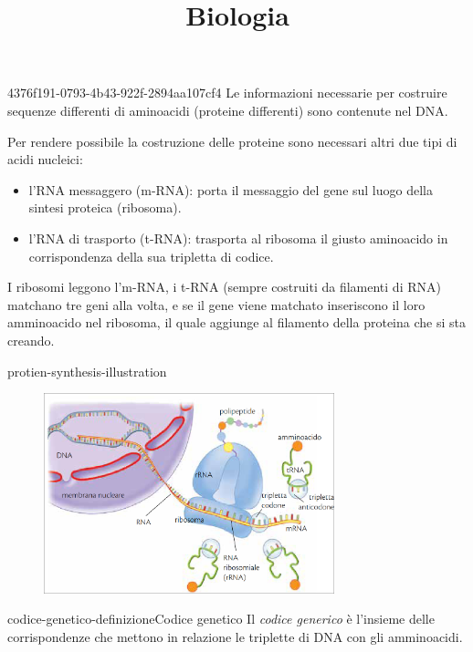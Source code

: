 \documentclass[preview]{standalone}
\begin{document}
\title{Biologia}
\genpage

\begin{snippet}{4376f191-0793-4b43-922f-2894aa107cf4}
    Le informazioni necessarie per costruire sequenze
    differenti di aminoacidi (proteine differenti) sono
    contenute nel DNA.
    
    Per rendere possibile la costruzione delle proteine sono
    necessari altri due tipi di acidi nucleici:
    
    \begin{itemize}
        \item l'RNA messaggero (m-RNA): porta il messaggio del
            gene sul luogo della sintesi proteica (ribosoma).
        \item l'RNA di trasporto (t-RNA): trasporta al ribosoma il
            giusto aminoacido in corrispondenza della sua
            tripletta di codice.
    \end{itemize}
    
    I ribosomi leggono l'm-RNA, i t-RNA (sempre costruiti da filamenti di RNA)
    matchano tre geni alla volta, e se il gene
    viene matchato inseriscono il loro amminoacido nel ribosoma, il quale
    aggiunge al filamento della proteina che si sta creando.
\end{snippet}

\begin{snippet}{protien-synthesis-illustration}
    \begin{center}
    \begin{figure}[th]
        \centering
        \includegraphics[width=0.75\textwidth]{./resources/protein_synthesis.png}
    \end{figure}
    \end{center}
\end{snippet}

\begin{snippetdefinition}{codice-genetico-definizione}{Codice genetico}
    Il \textit{codice generico} è l'insieme
    delle corrispondenze che mettono in
    relazione le triplette di DNA con gli amminoacidi.
\end{snippetdefinition}
\end{document}
